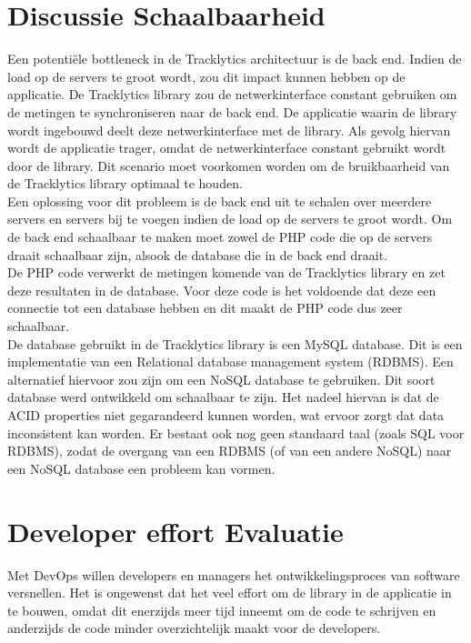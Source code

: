 \section{Discussie Schaalbaarheid} \label{schaalbaarheid}
Een potenti\"ele bottleneck in de Tracklytics architectuur is de back end. Indien de load op de servers te groot wordt, zou dit impact kunnen hebben op de applicatie. De Tracklytics library zou de netwerkinterface constant gebruiken om de metingen te synchroniseren naar de back end. De applicatie waarin de library wordt ingebouwd deelt deze netwerkinterface met de library. Als gevolg hiervan wordt de applicatie trager, omdat de netwerkinterface constant gebruikt wordt door de library. Dit scenario moet voorkomen worden om de bruikbaarheid van de Tracklytics library optimaal te houden.\\

Een oplossing voor dit probleem is de back end uit te schalen over meerdere servers en servers bij te voegen indien de load op de servers te groot wordt. Om de back end schaalbaar te maken moet zowel de PHP code die op de servers draait schaalbaar zijn, alsook de database die in de back end draait. \\

De PHP code verwerkt de metingen komende van de Tracklytics library en zet deze resultaten in de database. Voor deze code is het voldoende dat deze een connectie tot een database hebben en dit maakt de PHP code dus zeer schaalbaar.\\

De database gebruikt in de Tracklytics library is een MySQL database. Dit is een implementatie van een Relational database management system (RDBMS). Een alternatief hiervoor zou zijn om een NoSQL database te gebruiken. Dit soort database werd ontwikkeld om schaalbaar te zijn. Het nadeel hiervan is dat de ACID properties niet gegarandeerd kunnen worden, wat ervoor zorgt dat data inconsistent kan worden. Er bestaat ook nog geen standaard taal (zoals SQL voor RDBMS), zodat de overgang van een RDBMS (of van een andere NoSQL) naar een NoSQL database een probleem kan vormen. \\


\section{Developer effort Evaluatie}\label{Section:Effort}
Met DevOps willen developers en managers het ontwikkelingsproces van software versnellen. Het is ongewenst dat het veel effort om de library in de applicatie in te bouwen, omdat dit enerzijds meer tijd inneemt om de code te schrijven en anderzijds de code minder overzichtelijk maakt voor de developers. \\

